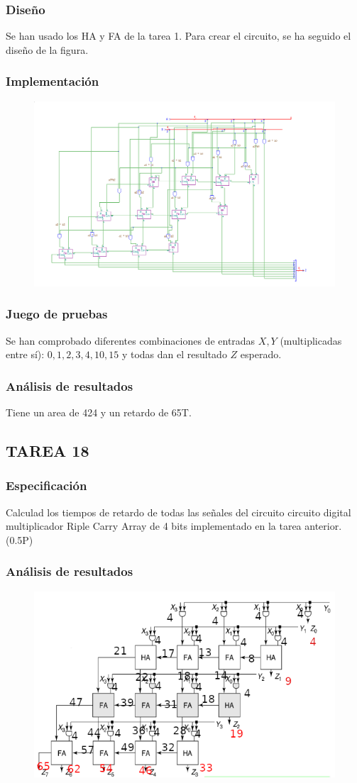 \documentclass{article}
\begin{document}
		\subsubsection*{Diseño}
		Se han usado los HA y FA de la tarea 1. Para crear el circuito, se ha seguido el diseño de la figura.


		\subsubsection*{Implementación}
		 \begin{figure}[ht]
		 	\includegraphics[width=0.8\linewidth]{RCA4}
		 	\centering
		 \end{figure}


		\subsubsection*{Juego de pruebas}
		Se han comprobado diferentes combinaciones de entradas $X,Y$ (multiplicadas entre sí): $0, 1, 2, 3, 4, 10, 15$ y todas dan el resultado $Z$ esperado.


		\subsubsection*{Análisis de resultados}
		Tiene un area de 424 y un retardo de 65T.
	\subsection{TAREA 18}
		\subsubsection*{Especificación}
		Calculad los tiempos de retardo de todas las señales del circuito circuito digital
		multiplicador Riple Carry Array de 4 bits implementado en la tarea anterior. (0.5P)
		\subsubsection*{Análisis de resultados}
		\begin{figure}[ht]
			\includegraphics[width=0.8\linewidth]{RCA_RETARD}
			\centering
		\end{figure}
\end{document}
